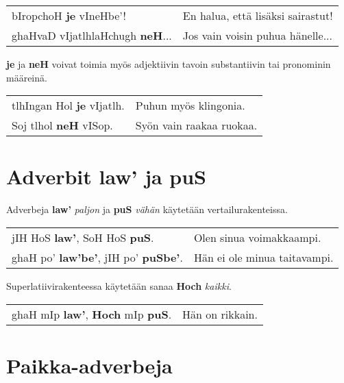 \documentclass{book}
\begin{document}
\begin{tabular}{l l}
    bIropchoH \textbf{je} vIneHbe'! & En halua, että lisäksi sairastut! \\
    ghaHvaD vIjatlhlaHchugh \textbf{neH}... & Jos vain voisin puhua hänelle... \\
\end{tabular}

\textbf{je} ja \textbf{neH} voivat toimia myös adjektiivin tavoin substantiivin tai pronominin määreinä.

\begin{tabular}{l l}
    tlhIngan Hol \textbf{je} vIjatlh. & Puhun myös klingonia. \\
    Soj tlhol \textbf{neH} vISop. & Syön vain raakaa ruokaa. \\
\end{tabular}


\section{Adverbit law' ja puS}

Adverbeja \textbf{law'} \textit{paljon} ja \textbf{puS} \textit{vähän} käytetään vertailurakenteissa.

\begin{tabular}{l l}
    jIH HoS \textbf{law'}, SoH HoS \textbf{puS}. & Olen sinua voimakkaampi. \\
    ghaH po' \textbf{law'be'}, jIH po' \textbf{puSbe'}. & Hän ei ole minua taitavampi. \\
\end{tabular}

Superlatiivirakenteessa käytetään sanaa \textbf{Hoch} \textit{kaikki}.

\begin{tabular}{l l}
    ghaH mIp \textbf{law'}, \textbf{Hoch} mIp \textbf{puS}. & Hän on rikkain. \\
\end{tabular}

\section{Paikka-adverbeja}
\end{document}
